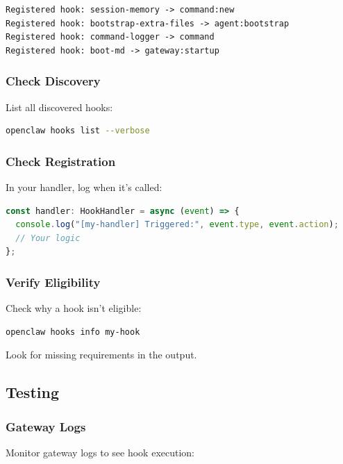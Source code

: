 \begin{lstlisting}
Registered hook: session-memory -> command:new
Registered hook: bootstrap-extra-files -> agent:bootstrap
Registered hook: command-logger -> command
Registered hook: boot-md -> gateway:startup
\end{lstlisting}


\subsubsection{Check Discovery}


List all discovered hooks:

\begin{lstlisting}[language=bash]
openclaw hooks list --verbose
\end{lstlisting}


\subsubsection{Check Registration}


In your handler, log when it's called:

\begin{lstlisting}[language=typescript]
const handler: HookHandler = async (event) => {
  console.log("[my-handler] Triggered:", event.type, event.action);
  // Your logic
};
\end{lstlisting}


\subsubsection{Verify Eligibility}


Check why a hook isn't eligible:

\begin{lstlisting}[language=bash]
openclaw hooks info my-hook
\end{lstlisting}


Look for missing requirements in the output.

\subsection{Testing}


\subsubsection{Gateway Logs}


Monitor gateway logs to see hook execution:

